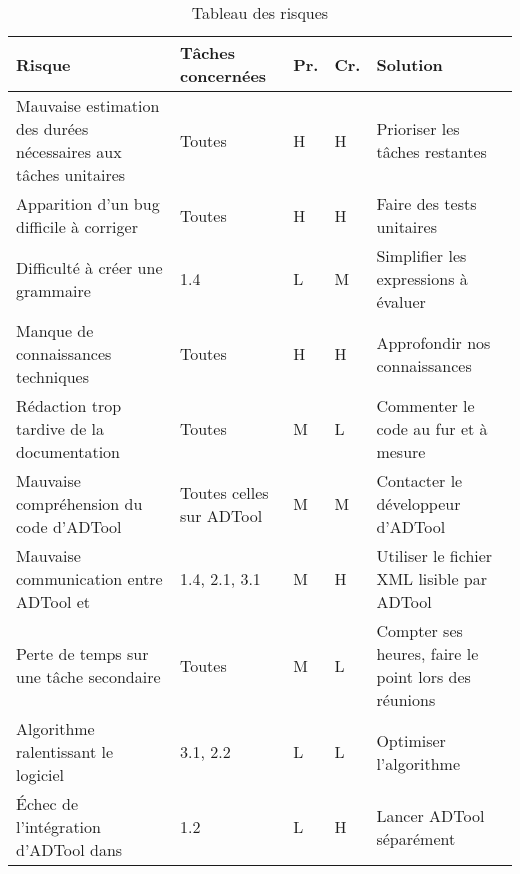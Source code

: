     \begin{table}[H]
        \centering
        \begin{tabular}{|p{4cm}|l|l|l|p{4cm}|}
        	\hline
            \textbf{Risque} & \textbf{Tâches concernées} & \textbf{Pr.} & \textbf{Cr.} & \textbf{Solution}\\
            \hline
            Mauvaise estimation des durées nécessaires aux tâches unitaires & 
                Toutes & H & H &
                Prioriser les tâches restantes\\ 
            \hline
            Apparition d'un bug difficile à corriger & 
                Toutes & H & H &
                Faire des tests unitaires\\
            \hline
            Difficulté à créer une grammaire & 
                1.4 & L & M &
                Simplifier les expressions à évaluer\\ 
            \hline
            Manque de connaissances techniques & 
                Toutes & H & H &
                Approfondir nos connaissances\\ 
            \hline
            Rédaction trop tardive de la documentation & 
                Toutes & M & L &
                Commenter le code au fur et à mesure\\
            \hline
            Mauvaise compréhension du code d'ADTool & 
                Toutes celles sur ADTool & M & M &
                Contacter le développeur d'ADTool\\ 
            \hline
            Mauvaise communication entre ADTool et \glasir{} & 
                1.4, 2.1, 3.1 & M & H &
                Utiliser le fichier XML lisible par ADTool\\ 
            \hline
            Perte de temps sur une tâche secondaire & 
                Toutes & M & L &
                Compter ses heures, faire le point lors des réunions\\ 
            \hline
            Algorithme ralentissant le logiciel & 
                3.1, 2.2 & L & L &
                Optimiser l’algorithme\\ 
            \hline
            Échec de l'intégration d'ADTool dans \glasir{} & 
                1.2 & L & H &
                Lancer ADTool séparément\\ 
            \hline
        \end{tabular}
        \caption{Tableau des risques}
        \label{fig:risques}
    \end{table}